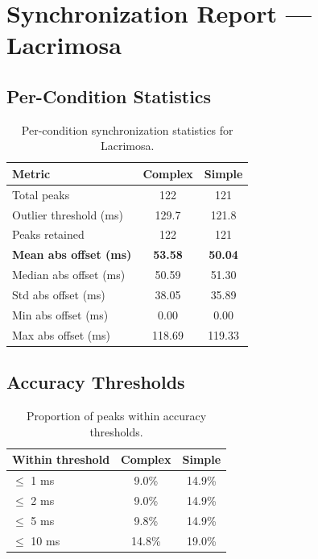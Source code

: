 
\section*{Synchronization Report --- Lacrimosa}

\subsection*{Per-Condition Statistics}

\begin{table}[h!]
\centering
\begin{tabular}{|l|c|c|}
\hline
Metric & Complex & Simple \\
\hline
Total peaks & 122 & 121 \\
Outlier threshold (ms) & 129.7 & 121.8 \\
Peaks retained & 122 & 121 \\
\textbf{Mean abs offset (ms)} & \textbf{53.58} & \textbf{50.04} \\
Median abs offset (ms) & 50.59 & 51.30 \\
Std abs offset (ms) & 38.05 & 35.89 \\
Min abs offset (ms) & 0.00 & 0.00 \\
Max abs offset (ms) & 118.69 & 119.33 \\
\hline
\end{tabular}
\caption{Per-condition synchronization statistics for Lacrimosa.}
\label{tab:sync_stats}
\end{table}

\subsection*{Accuracy Thresholds}

\begin{table}[h!]
\centering
\begin{tabular}{|l|c|c|}
\hline
Within threshold & Complex & Simple \\
\hline
$\leq$ 1 ms & 9.0\% & 14.9\% \\
$\leq$ 2 ms & 9.0\% & 14.9\% \\
$\leq$ 5 ms & 9.8\% & 14.9\% \\
$\leq$ 10 ms & 14.8\% & 19.0\% \\
\hline
\end{tabular}
\caption{Proportion of peaks within accuracy thresholds.}
\label{tab:sync_accuracy}
\end{table}

